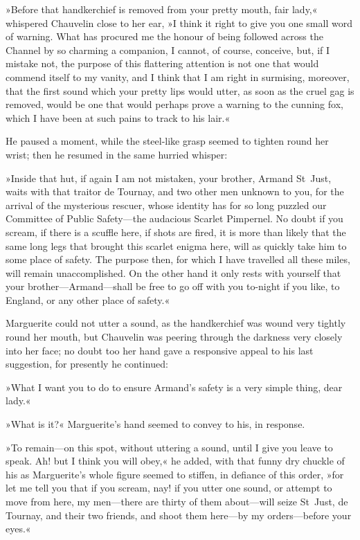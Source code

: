 »Before that handkerchief is removed from your pretty mouth, fair lady,« whispered Chauvelin close to her ear, »I think it right to give you one small word of warning. What has procured me the honour of being followed across the Channel by so charming a companion, I cannot, of course, conceive, but, if I mistake not, the purpose of this flattering attention is not one that would commend itself to my vanity, and I think that I am right in surmising, moreover, that the first sound which your pretty lips would utter, as soon as the cruel gag is removed, would be one that would perhaps prove a warning to the cunning fox, which I have been at such pains to track to his lair.«

He paused a moment, while the steel-like grasp seemed to tighten round her wrist; then he resumed in the same hurried whisper:\longdash


»Inside that hut, if again I am not mistaken, your brother, Armand St~Just, waits with that traitor de Tournay, and two other men unknown to you, for the arrival of the mysterious rescuer, whose identity has for so long puzzled our Committee of Public Safety—the audacious Scarlet Pimpernel. No doubt if you scream, if there is a scuffle here, if shots are fired, it is more than likely that the same long legs that brought this scarlet enigma here, will as quickly take him to some place of safety. The purpose then, for which I have travelled all these miles, will remain unaccomplished. On the other hand it only rests with yourself that your brother—Armand—shall be free to go off with you to-night if you like, to England, or any other place of safety.«

Marguerite could not utter a sound, as the handkerchief was wound very tightly round her mouth, but Chauvelin was peering through the darkness very closely into her face; no doubt too her hand gave a responsive appeal to his last suggestion, for presently he continued:\longdash


»What I want you to do to ensure Armand's safety is a very simple thing, dear lady.«

»What is it?« Marguerite's hand seemed to convey to his, in response.

»To remain—on this spot, without uttering a sound, until I give you leave to speak. Ah! but I think you will obey,« he added, with that funny dry chuckle of his as Marguerite's whole figure seemed to stiffen, in defiance of this order, »for let me tell you that if you scream, nay! if you utter one sound, or attempt to move from here, my men—there are thirty of them about—will seize St~Just, de Tournay, and their two friends, and shoot them here—by my orders—before your eyes.«

